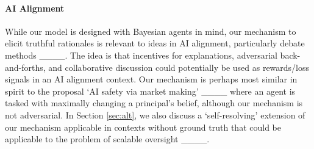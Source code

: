 \paragraph{AI Alignment}
While our model is designed with Bayesian agents in mind, our mechanism to elicit truthful rationales is relevant to ideas in AI alignment, particularly debate methods ____. The idea is that incentives for explanations, adversarial back-and-forths, and collaborative discussion could potentially be used as rewards/loss signals in an AI alignment context. Our mechanism is perhaps most similar in spirit to the proposal `AI safety via market making' ____ where an agent is tasked with maximally changing a principal's belief, although our mechanism is not adversarial. In Section \ref{sec:alt}, we also discuss a `self-resolving' extension of our mechanism applicable in contexts without ground truth that could be applicable to the problem of scalable oversight ____.


